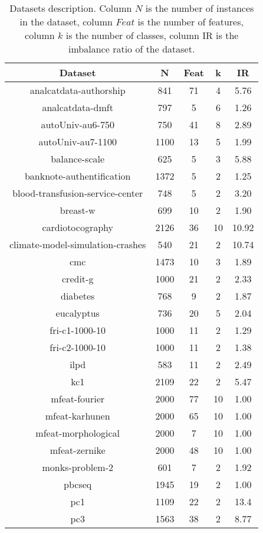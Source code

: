 \documentclass[review]{elsarticle}
\begin{document}
 \begin{table}[htbp]
 	\centering
 	\caption{Datasets description. Column $N$ is the number of instances in the dataset, column $Feat$ is the number of features, column $k$ is the number of classes, column IR is the imbalance ratio of the dataset.}
 	\renewcommand{\arraystretch}{0.7}
 	\begin{tabular}{c c c c c} 
 		\toprule
 		Dataset & N & Feat & k & IR \\
 		\midrule
 		analcatdata-authorship & 841 & 71 & 4 & 5.76 \\
 		analcatdata-dmft & 797 & 5 & 6 & 1.26 \\
 		autoUniv-au6-750 & 750 & 41 & 8 & 2.89 \\
 		autoUniv-au7-1100 & 1100 & 13 & 5 & 1.99 \\
 		balance-scale & 625 & 5 & 3 & 5.88 \\
 		banknote-authentification & 1372 & 5 & 2 & 1.25 \\
 		blood-transfusion-service-center & 748 & 5 & 2 & 3.20 \\
 		breast-w & 699 & 10 & 2 & 1.90 \\
 		cardiotocography & 2126 & 36 & 10 & 10.92 \\
 		climate-model-simulation-crashes & 540 & 21 & 2 & 10.74 \\
 		cmc & 1473 & 10 & 3 & 1.89 \\
 		credit-g & 1000 & 21 & 2 & 2.33 \\
 		diabetes & 768 & 9 & 2 & 1.87 \\
 		eucalyptus & 736 & 20 & 5 & 2.04 \\
 		fri-c1-1000-10 & 1000 & 11 & 2 & 1.29 \\
 		fri-c2-1000-10 & 1000 & 11 & 2 & 1.38 \\
 		ilpd & 583 & 11 & 2 & 2.49 \\
 		kc1 & 2109 & 22 & 2 & 5.47 \\
 		mfeat-fourier & 2000 & 77 & 10 & 1.00 \\
 		mfeat-karhunen & 2000 & 65 & 10 & 1.00 \\
 		mfeat-morphological & 2000 & 7 & 10 & 1.00 \\
 		mfeat-zernike & 2000 & 48 & 10 & 1.00 \\
 		monks-problem-2 & 601 & 7 & 2 & 1.92 \\
 		pbcseq & 1945 & 19 & 2 & 1.00 \\
 		pc1 & 1109 & 22 & 2 & 13.4 \\
 		pc3 & 1563 & 38 & 2 & 8.77 \\

\end{tabular}
\end{table}
\end{document}
